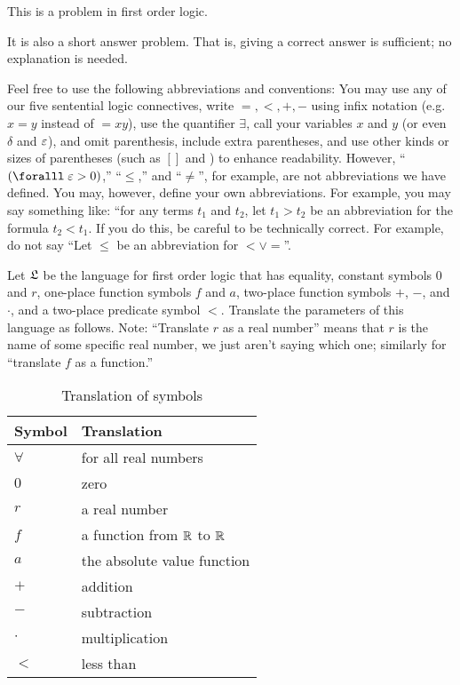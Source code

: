 \begin{problem}
  This is a problem in first order logic.

  \step
  It is also a short answer problem.
  That is, giving a correct answer is sufficient;
  no explanation is needed.

  \step
  Feel free to use the following abbreviations and conventions:
  You may use any of our five sentential logic connectives,
  write $=, <, +, -$ using infix notation
  (e.g. $x = y$ instead of $= xy$), use the quantifier $\exists$,
  call your variables $x$ and $y$ (or even $\delta$ and $\varepsilon$),
  and omit parenthesis, include extra parentheses,
  and use other kinds or sizes of parentheses
  (such as $[ ]$ and ${}$) to enhance readability.
  However, ``$(\forall \eps > 0)$,'' ``$\le$,'' and ``$\ne$'',
  for example, are not abbreviations we have defined.
  You may, however, define your own abbreviations.
  For example, you may say something like:
  ``for any terms $t_1$ and $t_2$, let $t_1 > t_2$ be an abbreviation
  for the formula $t_2 < t_1$.
  If you do this, be careful to be technically correct.
  For example, do not say
  ``Let $\le$ be an abbreviation for $< \lor =$''.
  
  \step
  Let $\mathfrak{L}$ be the language for first order logic that has equality,
  constant symbols $0$ and $r$, one-place function symbols $f$ and $a$,
  two-place function symbols $+$, $-$, and $\cdot$,
  and a two-place predicate symbol $<$.
  Translate the parameters of this language as follows.
  Note: ``Translate $r$ as a real number''
  means that $r$ is the name of some specific real number,
  we just aren’t saying which one; similarly for
  ``translate $f$ as a function.''

  \begin{table}[H]
    \begin{tabular}{|l|l|}
      \bottomrule
      \textbf{Symbol} & \textbf{Translation} \\
      \midrule
      $\forall$ & for all real numbers \\
      $0$ & zero \\
      $r$ & a real number \\
      $f$ & a function from $\mathbb{R}$ to $\mathbb{R}$ \\
      $a$ & the absolute value function \\
      $+$ & addition \\
      $-$ & subtraction \\
      $\cdot$ & multiplication \\
      $<$ & less than \\
      \toprule
    \end{tabular}
    \caption{Translation of symbols}
  \end{table}


\end{problem}

